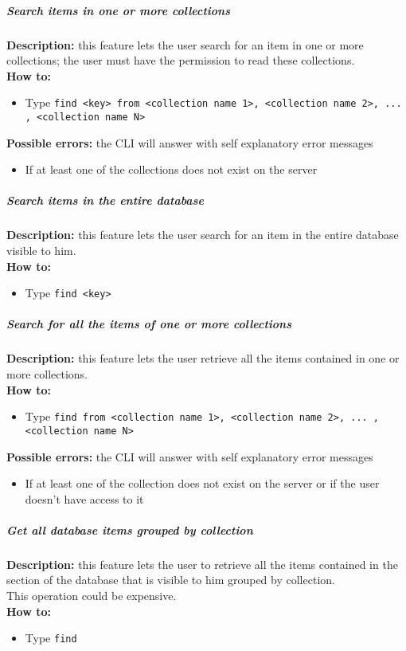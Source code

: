 \documentclass{scalatekids-article}
\begin{document}
\subparagraph{Search items in one or more collections}
\textbf{Description:} this feature lets the user search for an item in one or more collections; the user must have the permission to read these collections.\\
\textbf{How to:} 
\begin{itemize}
	\item Type \texttt{find <key> from <collection name 1>, <collection name 2>, ... , <collection name N>}
\end{itemize}
\textbf{Possible errors:} the CLI will answer with self explanatory error messages 
\begin{itemize}
	\item If at least one of the collections does not exist on the server
\end{itemize}

\subparagraph{Search items in the entire database}
\textbf{Description:} this feature lets the user search for an item in the entire database visible to him.\\
\textbf{How to:} 
\begin{itemize}
	\item Type \texttt{find <key>}
\end{itemize}

\subparagraph{Search for all the items of one or more collections}
\textbf{Description:} this feature lets the user retrieve all the items contained in one or more collections.\\
\textbf{How to:} 
\begin{itemize}
	\item Type \texttt{find from <collection name 1>, <collection name 2>, ... , <collection name N>}
\end{itemize}
\textbf{Possible errors:} the CLI will answer with self explanatory error messages 
\begin{itemize}
	\item If at least one of the collection does not exist on the server or if the user doesn't have access to it
\end{itemize}

\subparagraph{Get all database items grouped by collection}
\textbf{Description:} this feature lets the user to retrieve all the items contained in the section of the database that is visible to him grouped by collection.\\
This operation could be expensive.\\
\textbf{How to:} 
\begin{itemize}
	\item Type \texttt{find}
\end{itemize}
\end{document}
